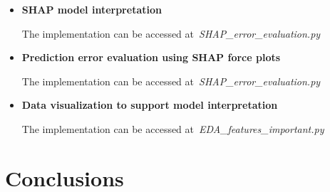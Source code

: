 \documentclass{article}
\begin{document}
{\begin{itemize}
\item \textbf{SHAP model interpretation}

The implementation can be accessed at~\emph{SHAP\_error\_evaluation.py}

\item \textbf{Prediction error evaluation using SHAP force plots}

The implementation can be accessed at~\emph{SHAP\_error\_evaluation.py}

\item \textbf{Data visualization to support model interpretation}

The implementation can be accessed at~\emph{EDA\_features\_important.py}


\end{itemize}
\section{Conclusions}
\label{sec:conclu}






}
\end{document}
